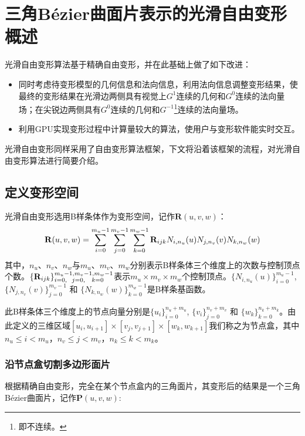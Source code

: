 
\chapter{三角Bézier曲面片表示的光滑自由变形概述}
光滑自由变形算法基于精确自由变形\cite{Feng98}，并在此基础上做了如下改进：

\begin{itemize}
    \item 同时考虑待变形模型的几何信息和法向信息，利用法向信息调整变形结果，使最终的变形结果在光滑边两侧具有视觉上$G^1$连续的几何和$G^0$连续的法向量场；在尖锐边两侧具有$G^0$连续的几何和$G^{-1}$\footnote{即不连续。}连续的法向量场。
        \item 利用GPU实现变形过程中计算量较大的算法，使用户与变形软件能实时交互。
\end{itemize}

光滑自由变形同样采用了自由变形算法框架，下文将沿着该框架的流程，对光滑自由变形算法进行简要介绍。

\section{定义变形空间}
光滑自由变形选用B样条体作为变形空间，记作$\mathbf R(u,v,w)$：
\begin{equation}
	\footnotesize
	{\mathbf R}(u,v,w) 
	= \sum_{i=0}^{m_u-1}\sum_{j=0}^{m_v-1}\sum_{k=0}^{m_w-1} {\mathbf R}_{ijk}N_{i,n_u}(u)N_{j,n_v}(v)N_{k,n_w}(w)
	\label{equ:Ruvw}
\end{equation}
其中，$n_u$、$n_v$、$n_w$与$m_u$、$m_v$、$m_w$分别表示B样条体三个维度上的次数与控制顶点个数。$\{\mathbf R_{ijk}\}_{i=0,\hspace{6 pt} j=0,\hspace{8 pt} k=0}^{m_u-1,m_v-1,m_w-1}$表示$m_u\times m_v\times m_w$个控制顶点。$\{N_{i,n_u}(u)\}_{i=0}^{m_u-1}$, $\{N_{j,n_v}(v)\}_{j=0}^{m_v-1}$ 和 $\{N_{k,n_w}(w)\}_{k=0}^{m_w-1}$是B样条基函数。

此B样条体三个维度上的节点向量分别是$\{u_i\}^{n_u+m_u}_{i=0}$, $\{v_i\}^{n_v+m_v}_{j=0}$ 和 $\{w_k\}^{n_k+m_k}_{k=0}$。由此定义的三维区域$[u_i, u_{i+1}] \times [v_j, v_{j+1}] \times [w_k, w_{k+1}]$我们称之为节点盒，其中$n_u\leq i < m_u$，$n_v\leq j < m_v$，$n_k\leq k < m_k$。

\subsection{沿节点盒切割多边形面片} \label{sec:clip_against_knot_box}
根据精确自由变形\cite{Feng98, Feng00}，完全在某个节点盒内的三角面片，其变形后的结果是一个三角Bézier曲面片，记作${\mathbf P}(u,v,w)$:\label{section:split}

